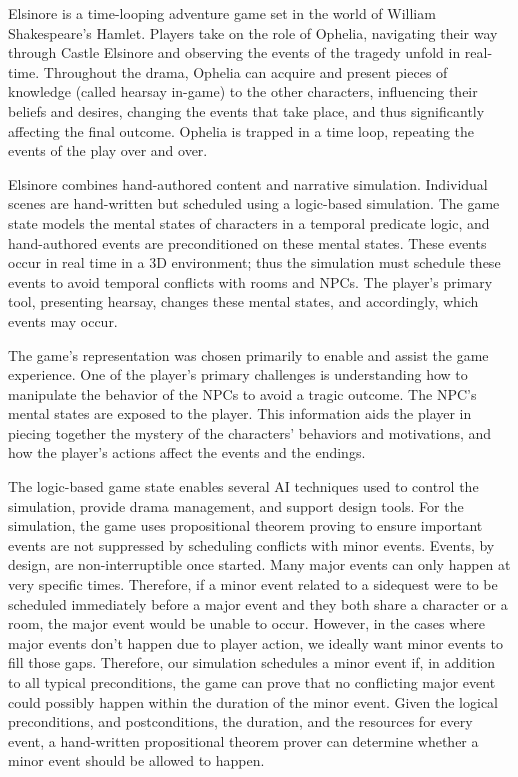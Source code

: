 Elsinore is a time-looping adventure game set in the world of William Shakespeare's Hamlet.
Players take on the role of Ophelia, navigating their way through Castle Elsinore and observing the events of the tragedy unfold in real-time.
Throughout the drama, Ophelia can acquire and present pieces of knowledge (called hearsay in-game) to the other characters, influencing their beliefs and desires, changing the events that take place, and thus significantly affecting the final outcome.
Ophelia is trapped in a time loop, repeating the events of the play over and over.

Elsinore combines hand-authored content and narrative simulation.
Individual scenes are hand-written but scheduled using a logic-based simulation.
The game state models the mental states of characters in a temporal predicate logic, and hand-authored events are preconditioned on these mental states.
These events occur in real time in a 3D environment; thus the simulation must schedule these events to avoid temporal conflicts with rooms and NPCs.
The player's primary tool, presenting hearsay, changes these mental states, and accordingly, which events may occur.

The game's representation was chosen primarily to enable and assist the game experience.
One of the player's primary challenges is understanding how to manipulate the behavior of the NPCs to avoid a tragic outcome.
The NPC's mental states are exposed to the player.
This information aids the player in piecing together the mystery of the characters' behaviors and motivations, and how the player's actions affect the events and the endings.

The logic-based game state enables several AI techniques used to control the simulation, provide drama management, and support design tools.
For the simulation, the game uses propositional theorem proving to ensure important events are not suppressed by scheduling conflicts with minor events.
Events, by design, are non-interruptible once started.
Many major events can only happen at very specific times.
Therefore, if a minor event related to a sidequest were to be scheduled immediately before a major event and they both share a character or a room, the major event would be unable to occur.
However, in the cases where major events don't happen due to player action, we ideally want minor events to fill those gaps.
Therefore, our simulation schedules a minor event if, in addition to all typical preconditions, the game can prove that no conflicting major event could possibly happen within the duration of the minor event.
Given the logical preconditions, and postconditions, the duration, and the resources for every event, a hand-written propositional theorem prover can determine whether a minor event should be allowed to happen.

